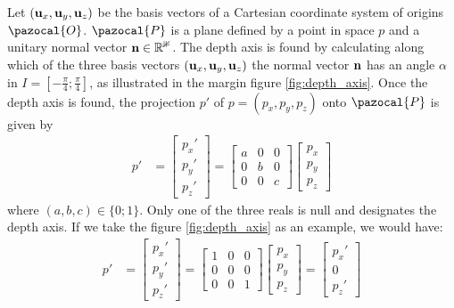 \documentclass[
	a4paper,
	12pt,
	raggedright,
	twoside
]{tufte-style-article}
\theoremstyle{definition}
\theoremstyle{remark}
\begin{document}
Let $(\vb{u}_x, \vb{u}_y, \vb{u}_z)$ be the basis vectors of a Cartesian coordinate system of origins $\pazocal{O}$. $\pazocal{P}$ is a plane defined by a point in space $p$ and a unitary normal vector $\vb{n} \in \mathbb{R^3}$. The depth axis is found by calculating along which of the three basis vectors $(\vb{u}_x, \vb{u}_y, \vb{u}_z)$ the normal vector $\vb{n}$ has an angle $\alpha$ in $I = [-\frac{\pi}{4}; \frac{\pi}{4}]$, as illustrated in the margin figure \ref{fig:depth_axis}. Once the depth axis is found, the projection $p'$ of $p = (p_x, p_y, p_z)$ onto $\pazocal{P}$ is given by
\begin{align}
    p' &=
    \begin{bmatrix}
    p_x' \\
    p_y' \\
    p_z'
    \end{bmatrix}
    =
    \begin{bmatrix}
    a & 0 & 0\\
    0 & b & 0 \\
    0 & 0 & c
    \end{bmatrix}
    \begin{bmatrix}
    p_x \\
    p_y \\
    p_z
    \end{bmatrix}
\end{align}
where $(a,b,c) \in \{0;1\}$. Only one of the three reals is null and designates the depth axis. If we take the figure \ref{fig:depth_axis} as an example, we would have:
\begin{align}
    p' &=
    \begin{bmatrix}
    p_x' \\
    p_y' \\
    p_z'
    \end{bmatrix}
    =
    \begin{bmatrix}
    1 & 0 & 0\\
    0 & 0 & 0 \\
    0 & 0 & 1
    \end{bmatrix}
    \begin{bmatrix}
    p_x \\
    p_y \\
    p_z
    \end{bmatrix}
    =
    \begin{bmatrix}
    p_x' \\
    0 \\
    p_z'
    \end{bmatrix}
\end{align}
\end{document}
